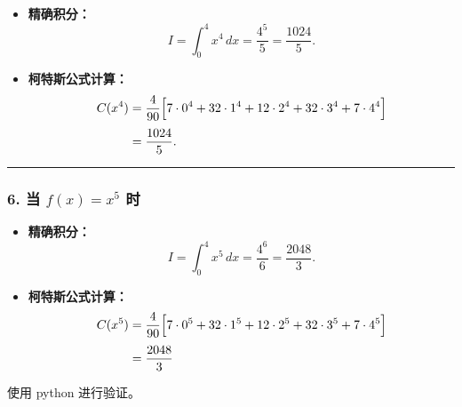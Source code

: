 \documentclass[11pt]{article}
\begin{document}
\begin{itemize}
\item
  \textbf{精确积分：} \[
  I = \int_0^4 x^4\,dx = \frac{4^5}{5} = \frac{1024}{5}.
  \]
\item
  \textbf{柯特斯公式计算：} \[
  \begin{aligned}
  C(x^4)
  &=\frac{4}{90}\Bigl[7\cdot0^4+32\cdot1^4+12\cdot2^4+32\cdot3^4+7\cdot4^4\Bigr]\\[1mm]&= \frac{1024}{5}.
  \end{aligned}
  \]
\end{itemize}

\begin{center}\rule{0.5\linewidth}{0.5pt}\end{center}

\subsubsection{\texorpdfstring{6. 当 \(f(x)=x^5\)
时}{6. 当 f(x)=x\^{}5 时}}\label{ux5f53-fxx5-ux65f6}

\begin{itemize}
\item
  \textbf{精确积分：} \[
  I = \int_0^4 x^5\,dx = \frac{4^6}{6} = \frac{2048}{3}.
  \]
\item
  \textbf{柯特斯公式计算：} \[
  \begin{aligned}
  C(x^5)
  &=\frac{4}{90}\Bigl[7\cdot0^5+32\cdot1^5+12\cdot2^5+32\cdot3^5+7\cdot4^5\Bigr]\\[1mm]
  &=\frac{2048}{3}
  \end{aligned}
  \]
\end{itemize}

使用 python 进行验证。
\end{document}
